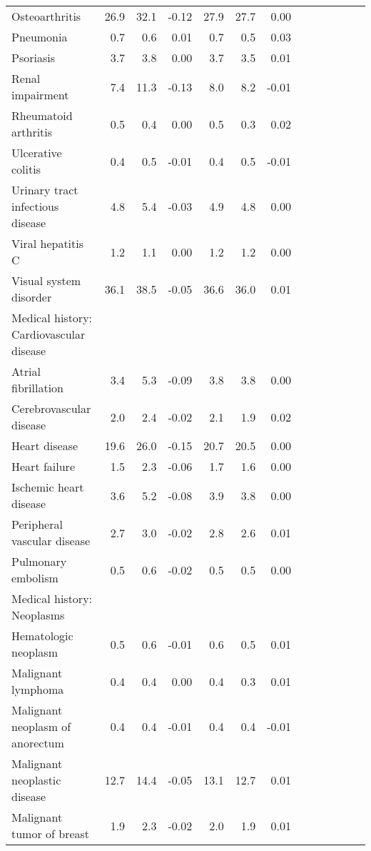 \documentclass[11pt,]{article}
\begin{document}
\begin{longtable}{lrrrrrrrrrrrr}
      Osteoarthritis & 26.9 & 32.1 & -0.12 & 27.9 & 27.7 &  0.00 \\ 
      Pneumonia &  0.7 &  0.6 &  0.01 &  0.7 &  0.5 &  0.03 \\ 
      Psoriasis &  3.7 &  3.8 &  0.00 &  3.7 &  3.5 &  0.01 \\ 
      Renal impairment &  7.4 & 11.3 & -0.13 &  8.0 &  8.2 & -0.01 \\ 
      Rheumatoid arthritis &  0.5 &  0.4 &  0.00 &  0.5 &  0.3 &  0.02 \\ 
      Ulcerative colitis &  0.4 &  0.5 & -0.01 &  0.4 &  0.5 & -0.01 \\ 
      Urinary tract infectious disease &  4.8 &  5.4 & -0.03 &  4.9 &  4.8 &  0.00 \\ 
      Viral hepatitis C &  1.2 &  1.1 &  0.00 &  1.2 &  1.2 &  0.00 \\ 
      Visual system disorder & 36.1 & 38.5 & -0.05 & 36.6 & 36.0 &  0.01 \\ 
  Medical history: Cardiovascular disease &    &    &     &    &    &     \\ 
      Atrial fibrillation &  3.4 &  5.3 & -0.09 &  3.8 &  3.8 &  0.00 \\ 
      Cerebrovascular disease &  2.0 &  2.4 & -0.02 &  2.1 &  1.9 &  0.02 \\ 
      Heart disease & 19.6 & 26.0 & -0.15 & 20.7 & 20.5 &  0.00 \\ 
      Heart failure &  1.5 &  2.3 & -0.06 &  1.7 &  1.6 &  0.00 \\ 
      Ischemic heart disease &  3.6 &  5.2 & -0.08 &  3.9 &  3.8 &  0.00 \\ 
      Peripheral vascular disease &  2.7 &  3.0 & -0.02 &  2.8 &  2.6 &  0.01 \\ 
      Pulmonary embolism &  0.5 &  0.6 & -0.02 &  0.5 &  0.5 &  0.00 \\ 
  Medical history: Neoplasms &    &    &     &    &    &     \\ 
      Hematologic neoplasm &  0.5 &  0.6 & -0.01 &  0.6 &  0.5 &  0.01 \\ 
      Malignant lymphoma &  0.4 &  0.4 &  0.00 &  0.4 &  0.3 &  0.01 \\ 
      Malignant neoplasm of anorectum &  0.4 &  0.4 & -0.01 &  0.4 &  0.4 & -0.01 \\ 
      Malignant neoplastic disease & 12.7 & 14.4 & -0.05 & 13.1 & 12.7 &  0.01 \\ 
      Malignant tumor of breast &  1.9 &  2.3 & -0.02 &  2.0 &  1.9 &  0.01 \\ 

\end{longtable}
\end{document}
